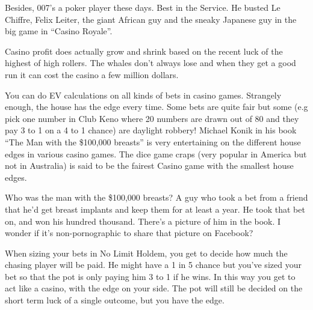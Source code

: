Besides, 007's a poker player these days. Best in the Service.
He busted Le Chiffre, Felix Leiter, the giant African guy and
the sneaky Japanese guy in the big game in ``Casino Royale''.

Casino profit does actually grow and shrink based on the recent luck
of the highest of high rollers. The whales don't always lose and when
they get a good run it can cost the casino a few million dollars.

You can do EV calculations on all kinds of bets in casino games.
Strangely enough, the house has the edge every time. Some bets
are quite fair but some (e.g pick one number in Club Keno
where 20 numbers are drawn out of 80 and they pay
3 to 1 on a 4 to 1 chance) are daylight robbery! Michael Konik
in his book ``The Man with the \$100,000 breasts'' is very
entertaining on the different house edges in various casino games. The
dice game craps (very popular in America but not in Australia)
is said to be the fairest Casino game with the smallest house edges.

Who was the man with the \$100,000 breasts? A guy who took a bet from
a friend that he'd get breast implants and keep them for at least a
year. He took that bet on, and won his hundred thousand. There's a
picture of him in the book. I wonder if it's non-pornographic to share
that picture on Facebook?

When sizing your bets in No Limit Holdem, you get to decide how much
the chasing player will be paid. He might have a 1 in 5 chance
but you've sized your bet so that the pot is only paying him 3 to 1
if he wins. In this way you get to act like a casino, with the edge
on your side. The pot will still be decided on the short term luck
of a single outcome, but you have the edge.

